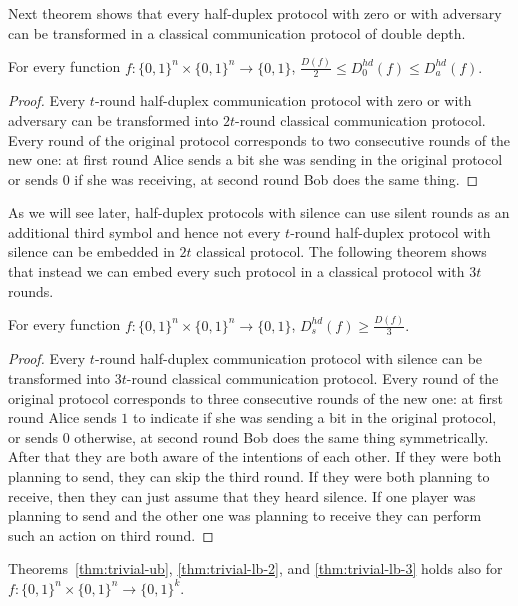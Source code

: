 Next theorem shows that every half-duplex protocol with zero or with adversary can be transformed
in a classical communication protocol of double depth. 
\begin{theorem}\label{thm:trivial-lb-2}
For every function $f:\{0,1\}^n\times \{0,1\}^n \to \{0,1\}$, 
$\frac{D(f)}{2}\le D^{hd}_0(f) \le D^{hd}_a(f).$
\end{theorem}
\begin{proof}
Every $t$-round half-duplex communication protocol with zero or with adversary can be transformed 
into $2t$-round classical communication protocol. Every round of the original protocol corresponds
to two consecutive rounds of the new one: at first round Alice sends a bit she was sending in the original protocol or sends $0$ if she was receiving, at second round Bob does the same thing.
\end{proof}

As we will see later, half-duplex protocols with silence can use silent rounds as an additional third 
symbol and hence not every $t$-round half-duplex protocol with silence can be embedded in $2t$ 
classical protocol. The following theorem shows that instead we can embed every such protocol 
in a classical protocol with $3t$ rounds.
\begin{theorem}\label{thm:trivial-lb-3}
For every function $f:\{0,1\}^n\times \{0,1\}^n \to \{0,1\}$,
$D^{hd}_s(f) \ge \frac{D(f)}{3}.$
\end{theorem}
\begin{proof}
Every $t$-round half-duplex communication protocol with silence can be transformed into $3t$-round
classical communication protocol. Every round of the original protocol corresponds to three consecutive
rounds of the new one: at first round Alice sends $1$ to indicate if she was sending a bit in the original protocol, or sends $0$ otherwise, at second round Bob does the same thing symmetrically. After that they are both aware of the intentions of each other. If they were both planning to send, they can skip the third round. If they were both planning to receive, then they can just assume that they heard silence. If one player was planning to send and the other one was planning to receive they can perform such an action on third round.
\end{proof}
\begin{remark}
	Theorems~\ref{thm:trivial-ub}, \ref{thm:trivial-lb-2}, and \ref{thm:trivial-lb-3} holds also for 
	$f:\{0,1\}^n\times\{0,1\}^n\to \{0,1\}^k$.
\end{remark}


